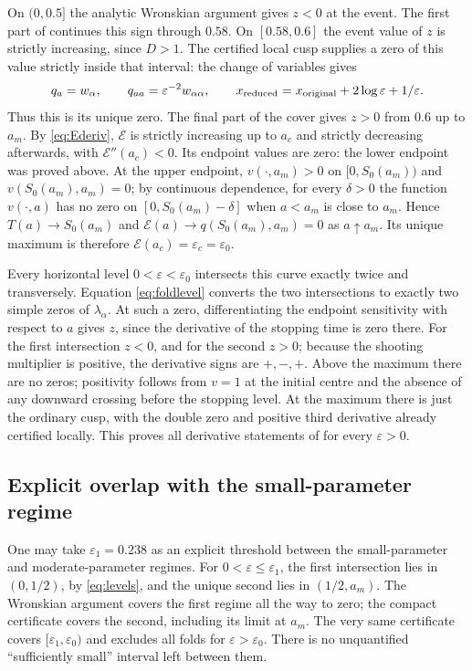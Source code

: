 \documentclass[11pt,a4paper]{report}
\begin{document}
On $(0,0.5]$ the analytic Wronskian argument gives $z<0$ at the event.
The first part of  continues this sign through $0.58$.
On $[0.58,0.6]$ the event value of $z$ is strictly increasing, since $D>1$.
The certified local cusp supplies a zero of this value strictly inside that
interval: the change of variables gives
\[
 q_a=w_\alpha,\qquad q_{aa}=\varepsilon^{-2}w_{\alpha\alpha},\qquad
 x_{\rm reduced}=x_{\rm original}+2\log\varepsilon+1/\varepsilon.
\]
Thus this is its unique zero. The final part of the cover gives $z>0$
from $0.6$ up to $a_m$. By \eqref{eq:Ederiv}, $\mathcal E$ is strictly
increasing up to $a_c$ and strictly decreasing afterwards, with
$\mathcal E''(a_c)<0$. Its endpoint values are zero:
the lower endpoint was proved above. At the upper endpoint, $v(\cdot,a_m)>0$ on
$[0,S_0(a_m))$ and $v(S_0(a_m),a_m)=0$; by continuous dependence, for every
$\delta>0$ the function $v(\cdot,a)$ has no zero on $[0,S_0(a_m)-\delta]$ when
$a<a_m$ is close to $a_m$. Hence $T(a)\to S_0(a_m)$ and
$\mathcal E(a)\to q(S_0(a_m),a_m)=0$ as $a\uparrow a_m$.
Its unique maximum is therefore
$\mathcal E(a_c)=\varepsilon_c=\varepsilon_0$.

Every horizontal level $0<\varepsilon<\varepsilon_0$ intersects this curve
exactly twice and transversely. Equation \eqref{eq:foldlevel} converts the
two intersections to exactly two simple zeros of $\lambda_\alpha$.
At such a zero, differentiating the endpoint sensitivity with respect to
$a$ gives $z$, since the derivative of the stopping time is zero there.
For the first intersection $z<0$, and for the second $z>0$; because the
shooting multiplier is positive, the derivative signs are $+,-,+$.
Above the maximum there are no zeros; positivity follows from $v=1$ at
the initial centre and the absence of any downward crossing before the
stopping level. At the maximum there is just the ordinary cusp, with the
double zero and positive third derivative already certified locally.
This proves all derivative statements of  for every
$\varepsilon>0$.

\subsection{Explicit overlap with the small-parameter regime}
One may take $\varepsilon_1=0.238$ as an explicit threshold between the
small-parameter and moderate-parameter regimes.
For $0<\varepsilon\leq\varepsilon_1$, the first intersection lies in
$(0,1/2)$, by \eqref{eq:levels}, and the unique second lies in $(1/2,a_m)$.
The Wronskian argument covers the first regime all the way to zero;
the compact certificate covers the second, including its limit at $a_m$.
The very same certificate covers $[\varepsilon_1,\varepsilon_0)$ and
excludes all folds for $\varepsilon>\varepsilon_0$.
There is no unquantified ``sufficiently small'' interval left between them.
\end{document}
